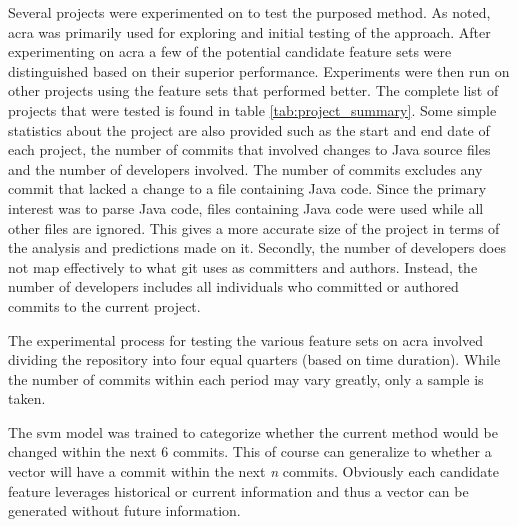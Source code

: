 Several projects were experimented on to test the purposed method. As noted, acra was primarily used for exploring and initial testing of the approach. After experimenting on acra a few of the potential candidate feature sets were distinguished based on their superior performance. Experiments were then run on other projects using the feature sets that performed better. The complete list of projects that were tested is found in table \ref{tab:project_summary}. Some simple statistics about the project are also provided such as the start and end date of each project, the number of commits that involved changes to Java source files and the number of developers involved. The number of commits excludes any commit that lacked a change to a file containing Java code. Since the primary interest was to parse Java code, files containing Java code were used while all other files are ignored. This gives a more accurate size of the project in terms of the analysis and predictions made on it. Secondly, the number of developers does not map effectively to what git uses as committers and authors. Instead, the number of developers includes all individuals who committed or authored commits to the current project. 


The experimental process for testing the various feature sets on acra involved dividing the repository into four equal quarters (based on time duration). While the number of commits within each period may vary greatly, only a sample is taken.

The \gls{svm} model was trained to categorize whether the current method would be changed within the next 6 commits. This of course can generalize to whether a vector will have a commit within the next \textit{n} commits. Obviously each candidate feature leverages historical or current information and thus a vector can be generated without future information.


